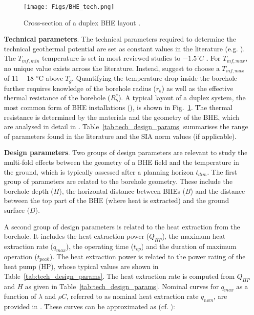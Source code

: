 \begin{figure}[b]
    \centering
    \texttt{[image: Figs/BHE\_tech.png]}
    \caption[Cross-section of a duplex BHE layout.]{Cross-section of a duplex BHE layout \citep{pahud_geothermal_2002}.}
    \label{fig:BHE_cross-sec}
\end{figure}

\textbf{Technical parameters}. The technical parameters required to determine the technical geothermal potential are set as constant values in the literature (e.g. \cite{miglani_methodology_2018,rivera_increased_2017,zhang_critical_2017}). The $T_\mathit{mf,min}$ temperature is set in most reviewed studies to $-1.5^\circ C$ \citet{sia_sondes_2010}.
For $T_\mathit{mf,max}$, no unique value exists across the literature. Instead, \citet{kavanaugh_geothermal_2014} suggest to choose a $T_\mathit{mf,max}$ of $11 - 18$ °C above $T_g$.
Quantifying the temperature drop inside the borehole further requires knowledge of the borehole radius ($r_b$) as well as the effective thermal resistance of the borehole ($R_b^*$). A typical layout of a duplex system, the most common form of BHE installations (\cite{sia_sondes_2010}), is shown in Fig.~\ref{fig:BHE_cross-sec}. The thermal resistance is determined by the materials and the geometry of the BHE, which are analysed in detail in \citep{huber_erdwarmesonden_2005}. Table~\ref{tab:tech_design_params} summarises the range of parameters found in the literature and the SIA norm values (if applicable).

\textbf{Design parameters}. Two groups of design parameters are relevant to study the multi-fold effects between the geometry of a BHE field and the temperature in the ground, which is typically assessed after a planning horizon $t_\mathit{dim}$. 
The first group of parameters are related to the borehole geometry. These include the borehole depth ($H$), the horizontal distance between BHEs ($B$) and the distance between the top part of the BHE (where heat is extracted) and the ground surface ($D$). 

A second group of design parameters is related to the heat extraction from the borehole. It includes the heat extraction power ($Q_{HP}$), the maximum heat extraction rate ($q_\mathit{max}$), the operating time ($t_{op}$) and the duration of maximum operation ($t_{peak}$). The heat extraction power is related to the power rating of the heat pump (HP), whose typical values are shown in Table~\ref{tab:tech_design_params}. 
The heat extraction rate is computed from $Q_{HP}$ and $H$ as given in Table~\ref{tab:tech_design_params}. Nominal curves for $q_\mathit{max}$ as a function of $\lambda$ and $\rho C$, referred to as nominal heat extraction rate $q_{nom}$, are provided in \cite{sia_sondes_2010}. These curves can be approximated as (cf. \cite{sia_sondes_2010}):

